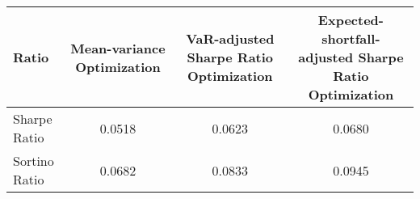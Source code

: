 \begin{tabular}{lccc}
\toprule
Ratio & Mean-variance Optimization & VaR-adjusted Sharpe Ratio Optimization & Expected-shortfall-adjusted Sharpe Ratio Optimization\\
\midrule
Sharpe Ratio & 0.0518 & 0.0623 & 0.0680\\
Sortino Ratio & 0.0682 & 0.0833 & 0.0945\\
\bottomrule
\end{tabular}
